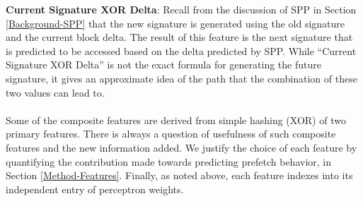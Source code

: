 %
\textbf{Current Signature XOR Delta}: Recall from the discussion of SPP in
Section \ref{Background-SPP} that the new signature is generated using the old
signature and the current block delta.  The result of this feature is the next
signature that is predicted to be accessed based on the delta predicted by
SPP. While ``Current Signature XOR Delta'' is not the exact formula for
generating the future signature, it gives an approximate idea of the path that
the combination of these two values can lead to. \\ \\
%
%
%
Some of the composite features are derived from simple hashing (XOR)
of two primary features.  There is always a question of usefulness of
such composite features and the new information added.  We justify the
choice of each feature by quantifying the contribution made towards
predicting prefetch behavior, in Section \ref{Method-Features}.
Finally, as noted above, each feature indexes into its independent
entry of perceptron weights.

